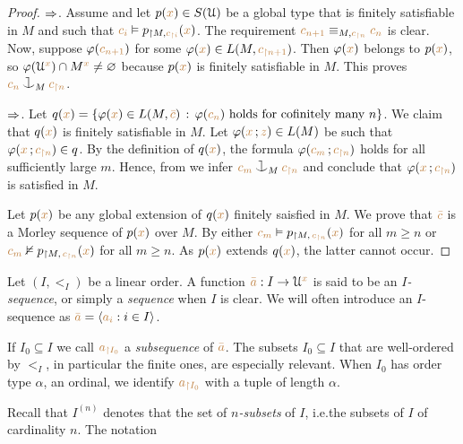\begin{proof}
$\Rightarrow$.
Assume  and let $p({\color{brown} x})\in S(\EuScript U)$ be a global type that is finitely satisfiable in $M$ and such that ${\color{brown} c_i}\vDash p_{\restriction M,{\color{brown} c_{\restriction i}}}({\color{brown} x})$.
The requirement ${\color{brown} c_{n+1}}\equiv_{M,{\color{brown} c_{\restriction n}}} {\color{brown} c_n}$ is clear.
Now, suppose $\varphi({\color{brown} c_{n+1}})$ for some $\varphi({\color{brown} x})\in L(M,{\color{brown} c_{\restriction n+1}})$.
Then $\varphi({\color{brown} x})$ belongs to $p({\color{brown} x})$, so $\varphi(\EuScript U^{\color{brown} x})\cap M^{\color{brown} x}\neq\varnothing$ because $p({\color{brown} x})$ is finitely satisfiable in $M$.
This proves ${\mr c_n}\cnonfork_M{\mr c_{\restriction n}}$.

$\Rightarrow$.
Let $q({\color{brown} x})=\{\varphi({\color{brown} x})\in L(M, {\color{brown}\bar c})\,:\, \varphi({\color{brown} c_n}) \textrm{ holds for cofinitely many } n\}$.
%
We claim that $q({\color{brown} x})$ is finitely satisfiable in $M$.
%
Let $\varphi({\color{brown} x}\,;{\color{brown} z})\in L(M)$ be such that $\varphi({\color{brown} x}\,;{\color{brown} c_{\restriction n}})\in q$.
%
By the definition of $q({\color{brown} x})$, the formula $\varphi({\color{brown} c_m}\,;{\color{brown} c_{\restriction n}})$ holds for all sufficiently large $m$.
%
Hence, from  we infer ${\mr c_m}\cnonfork_M{\mr c_{\restriction n}}$ and conclude that $\varphi({\color{brown} x}\,;{\color{brown} c_{\restriction n}})$ is satisfied in $M$.

Let $p({\color{brown} x})$ be any global extension of $q({\color{brown} x})$ finitely saisfied in $M$.
%
We prove that ${\color{brown}\bar c}$ is a Morley sequence of $p({\color{brown} x})$ over $M$.
%
By  either ${\color{brown} c_m}\vDash p_{\restriction  M,\,{\color{brown} c_{\restriction n}}}({\color{brown} x})$ for all $m\ge n$ or ${\color{brown} c_m}\nvDash p_{\restriction  M,\,{\color{brown} c_{\restriction n}}}({\color{brown} x})$ for all $m\ge n$.
%
As $p({\color{brown} x})$ extends $q({\color{brown} x})$, the latter cannot occur.
\end{proof}

Let $(I,<_I)$ be a linear order.
A function ${\color{brown}\bar a}:I\to\EuScript U^{\color{brown} x}$ is said to be an \emph{$I$-sequence}, or simply a \emph{sequence\/} when $I$ is clear.
We will often introduce an $I$-sequence as ${\color{brown}\bar a}=\langle{\color{brown}a_i}: i\in I\rangle$.

If $I_0\subseteq I$ we call ${\color{brown} a_{\restriction I_0}}$ a \emph{subsequence\/} of ${\color{brown}\bar a}$.
The subsets $I_0\subseteq I$ that are well-ordered by $<_I$, in particular the finite ones, are especially relevant.
When $I_0$ has order type $\alpha$, an ordinal, we identify ${\color{brown} a_{\restriction I_0}}$ with a tuple of length $\alpha$.

Recall that \emph{$I^{(n)}$} denotes that the set of \emph{$n$-subsets\/} of $I$,  i.e.\@ the subsets of $I$ of cardinality $n$.
The notation \smallskip

